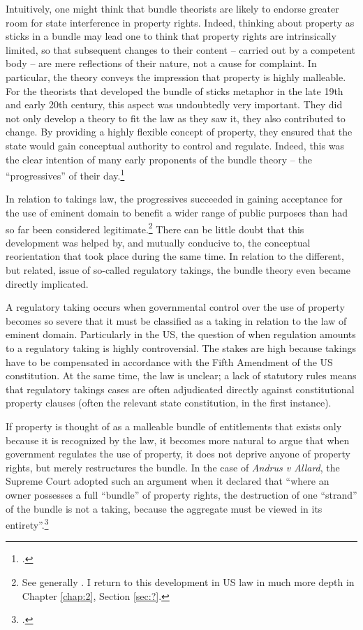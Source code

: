 Intuitively, one might think that bundle theorists are likely to endorse greater room for state interference in property rights. Indeed, thinking about property as sticks in a bundle may lead one to think that property rights are intrinsically limited, so that subsequent changes to their content -- carried out by a competent body -- are mere reflections of their nature, not a cause for complaint. In particular, the theory conveys the impression that property is highly malleable. For the theorists that developed the bundle of sticks metaphor in the late 19th and early 20th century, this aspect was undoubtedly very important. They did not only develop a theory to fit the law as they saw it, they also contributed to change. By providing a highly flexible concept of property, they ensured that the state would gain conceptual authority to control and regulate. Indeed, this was the clear intention of many early proponents of the bundle theory -- the ``progressives'' of their day.\footcite[195]{klein11}

In relation to takings law, the progressives succeeded in gaining acceptance for the use of eminent domain to benefit a wider range of public purposes than had so far been considered legitimate.\footnote{See generally \cite{yale49}. I return to this development in US law in much more depth in Chapter \ref{chap:2}, Section \ref{sec:?}. } There can be little doubt that this development was helped by, and mutually conducive to, the conceptual reorientation that took place during the same time. In relation to the different, but related, issue of so-called regulatory takings, the bundle theory even  became directly implicated. 

A regulatory taking occurs when governmental control over the use of property becomes so severe that it must be classified as a taking in relation to the law of eminent domain. Particularly in the US, the question of when regulation amounts to a regulatory taking is highly controversial. The stakes are high because takings have to be compensated in accordance with the Fifth Amendment of the US constitution. At the same time, the law is unclear; a lack of statutory rules means that regulatory takings cases are often adjudicated directly against constitutional property clauses (often the relevant state constitution, in the first instance).

If property is thought of as a malleable bundle of entitlements that exists only because it is recognized by the law, it becomes more natural to argue that when government regulates the use of property, it does not deprive anyone of property rights, but merely restructures the bundle. In the case of {\it Andrus v Allard}, the Supreme Court adopted such an argument when it declared that ``where an owner possesses a full ``bundle'' of property rights, the destruction of one ``strand'' of the bundle is not a taking, because the aggregate must be viewed in its entirety''.\footcite[65--66]{andrus79}

